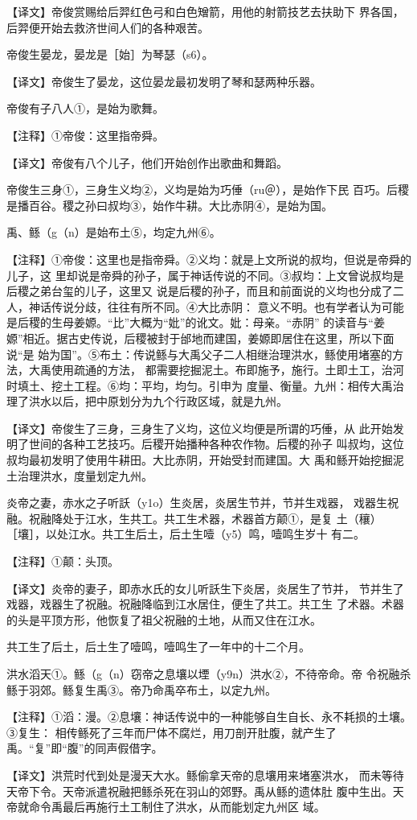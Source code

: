\documentclass[a4paper,12pt,UTF8,twoside]{ctexbook}
\begin{document}
【译文】帝俊赏赐给后羿红色弓和白色矰箭，用他的射箭技艺去扶助下 界各国，后羿便开始去救济世间人们的各种艰苦。

帝俊生晏龙，晏龙是［始］为琴瑟（s6）。

【译文】帝俊生了晏龙，这位晏龙最初发明了琴和瑟两种乐器。

帝俊有子八人①，是始为歌舞。

【注释】①帝俊：这里指帝舜。

【译文】帝俊有八个儿子，他们开始创作出歌曲和舞蹈。

帝俊生三身①，三身生义均②，义均是始为巧倕（ru＠），是始作下民 百巧。后稷是播百谷。稷之孙曰叔均③，始作牛耕。大比赤阴④，是始为国。

禹、鲧（g（n）是始布土⑤，均定九州⑥。

【注释】①帝俊：这里也是指帝舜。②义均：就是上文所说的叔均，但说是帝舜的儿子，这 里却说是帝舜的孙子，属于神话传说的不同。③叔均：上文曾说叔均是后稷之弟台玺的儿子，这里又 说是后稷的孙子，而且和前面说的义均也分成了二人，神话传说分歧，往往有所不同。④大比赤阴： 意义不明。也有学者认为可能是后稷的生母姜嫄。“比”大概为“妣”的讹文。妣：母亲。“赤阴” 的读音与“姜嫄”相近。据古史传说，后稷被封于邰地而建国，姜嫄即居住在这里，所以下面说“是 始为国”。⑤布土：传说鲧与大禹父子二人相继治理洪水，鲧使用堵塞的方法，大禹使用疏通的方法， 都需要挖掘泥土。布即施予，施行。土即土工，治河时填土、挖土工程。⑥均：平均，均匀。引申为 度量、衡量。九州：相传大禹治理了洪水以后，把中原划分为九个行政区域，就是九州。

【译文】帝俊生了三身，三身生了义均，这位义均便是所谓的巧倕，从 此开始发明了世间的各种工艺技巧。后稷开始播种各种农作物。后稷的孙子 叫叔均，这位叔均最初发明了使用牛耕田。大比赤阴，开始受封而建国。大 禹和鲧开始挖掘泥土治理洪水，度量划定九州。

炎帝之妻，赤水之子听訞（y1o）生炎居，炎居生节并，节并生戏器， 戏器生祝融。祝融降处于江水，生共工。共工生术器，术器首方颠①，是复 土（穰）［壤］，以处江水。共工生后土，后土生噎（y5）鸣，噎鸣生岁十 有二。

【注释】①颠：头顶。

【译文】炎帝的妻子，即赤水氏的女儿听訞生下炎居，炎居生了节并， 节并生了戏器，戏器生了祝融。祝融降临到江水居住，便生了共工。共工生 了术器。术器的头是平顶方形，他恢复了祖父祝融的土地，从而又住在江水。

共工生了后土，后土生了噎鸣，噎鸣生了一年中的十二个月。

洪水滔天①。鲧（g（n）窃帝之息壤以堙（y9n）洪水②，不待帝命。帝 令祝融杀鲧于羽郊。鲧复生禹③。帝乃命禹卒布土，以定九州。

【注释】①滔：漫。②息壤：神话传说中的一种能够自生自长、永不耗损的土壤。③复生： 相传鲧死了三年而尸体不腐烂，用刀剖开肚腹，就产生了禹。“复”即“腹”的同声假借字。

【译文】洪荒时代到处是漫天大水。鲧偷拿天帝的息壤用来堵塞洪水， 而未等待天帝下令。天帝派遣祝融把鲧杀死在羽山的郊野。禹从鲧的遗体肚 腹中生出。天帝就命令禹最后再施行土工制住了洪水，从而能划定九州区 域。







\backmatter
\end{document}

